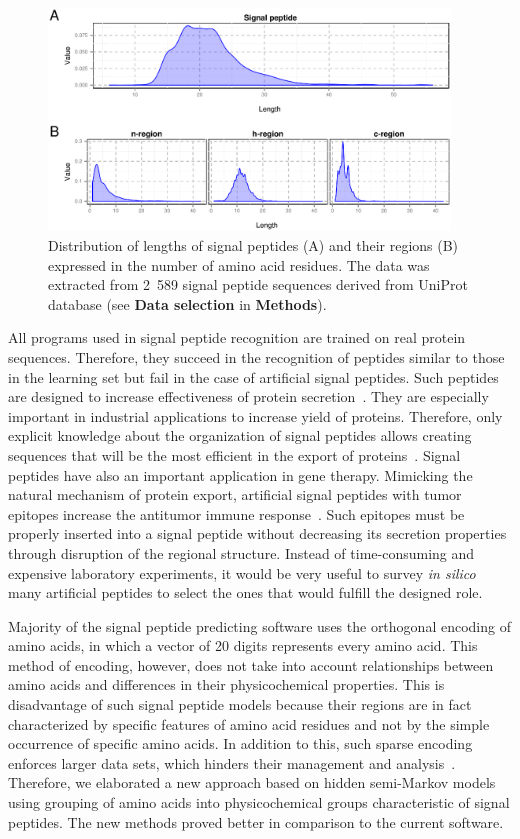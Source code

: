 \documentclass[fleqn,10pt,twoside]{gcb15submission}
\begin{document}
\begin{figure}[ht]\centering
\includegraphics[width=0.95\textwidth]{figures/reglen.eps}
\caption{Distribution of lengths of signal peptides (A) and their regions (B) expressed in the number of amino acid residues. The data was extracted from 2~589 signal peptide sequences derived from UniProt database (see \textbf{Data selection} in \textbf{Methods}).}
\label{fig:reglen}
\end{figure}

All programs used in signal peptide recognition are trained on real protein sequences. Therefore, they succeed in the recognition of peptides similar to those in the learning set but fail in the case of artificial signal peptides. Such peptides are designed to increase effectiveness of protein secretion~\citep{2010futatsumorisugaisignal}. They are especially important in industrial applications to increase yield of proteins. Therefore, only explicit knowledge about the organization of signal peptides allows creating sequences that will be the most efficient in the export of proteins~\citep{2013ngengineering}. Signal peptides have also an important application in gene therapy. Mimicking the natural mechanism of protein export, artificial signal peptides with tumor epitopes increase the antitumor immune response~\citep{2003heenhanced}. Such epitopes must be properly inserted into a signal peptide without decreasing its secretion properties through disruption of the regional structure. Instead of time-consuming and expensive laboratory experiments, it would be very useful to survey \textit{in silico} many artificial peptides to select the ones that would fulfill the designed role.

Majority of the signal peptide predicting software uses the orthogonal encoding of amino acids, in which a vector of 20 digits represents every amino acid. This method of encoding, however, does not take into account relationships between amino acids and differences in their physicochemical properties. This is disadvantage of such signal peptide models because their regions are in fact characterized by specific features of amino acid residues and not by the simple occurrence of specific amino acids. In addition to this, such sparse encoding enforces larger data sets, which hinders their management and analysis~\citep{2002linamino}. Therefore, we elaborated a new approach based on hidden semi-Markov models using grouping of amino acids into physicochemical groups characteristic of signal peptides. The new methods proved better in comparison to the current software.
\end{document}
